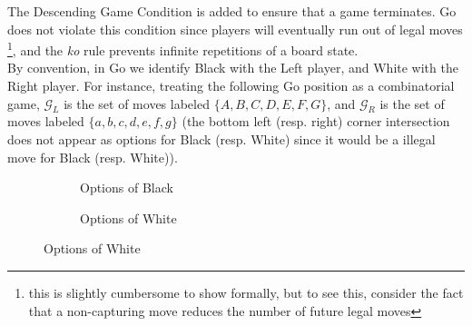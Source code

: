 \documentclass[../math194_paper.tex]{subfiles}
\begin{document}
The Descending Game Condition is added to ensure that a game terminates. Go does not violate 
this condition since players will eventually run out of legal moves \footnote{this is slightly 
cumbersome to show formally, but to see this, consider the fact that a non-capturing move reduces 
the number of future legal moves},
and the \textit{ko} rule prevents infinite repetitions of a board state. \\


By convention, in Go we identify Black with the Left player, and White with the Right player. 
For instance, treating the following Go position as a combinatorial game, 
$\mathcal{G}_L$ is the set of moves labeled $\{A, B, C, D, E, F,G \}$, and 
$\mathcal{G}_R$ is the set of moves labeled $\{a,b,c,d,e,f,g\}$
(the bottom left (resp. right) corner intersection does not appear as options for Black (resp. White) since 
it would be a illegal move for Black (resp. White)).

\begin{figure}[H]
\centering 
\begin{subfigure}[b]{0.45\linewidth}
\centering

\begin{psgoboard*}[4]
\end{psgoboard*}

\caption{Options of Black}

\end{subfigure}
\quad
\begin{subfigure}[b]{0.45\linewidth}
\centering

\begin{psgoboard*}[4]
\end{psgoboard*}

\caption{Options of White}

\end{subfigure}

\end{figure}
\end{document}
